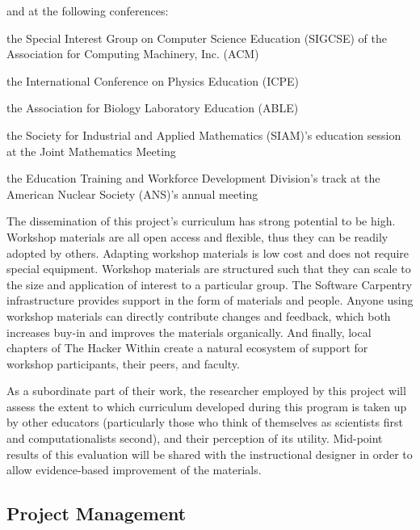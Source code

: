 \documentclass{proposalnsf}
\newlength{\up}
\begin{document}
and at the following conferences:

\begin{compactitem}

\item
  the Special Interest Group on Computer Science Education (SIGCSE) of the Association for Computing Machinery, Inc. (ACM)

\item
  the International Conference on Physics Education (ICPE)

\item
  the Association for Biology Laboratory Education (ABLE)

\item
  the Society for Industrial and Applied Mathematics (SIAM)'s education session at the Joint Mathematics Meeting

\item
  the Education Training and Workforce Development Division's track at the American Nuclear Society (ANS)'s annual meeting

\end{compactitem}

The dissemination of this project's curriculum has strong potential to
be high. Workshop materials are all open access and flexible, thus
they can be readily adopted by others. Adapting workshop materials is
low cost and does not require special equipment. Workshop materials
are structured such that they can scale to the size and application of
interest to a particular group. The Software Carpentry infrastructure
provides support in the form of materials and people. Anyone using
workshop materials can directly contribute changes and feedback, which
both increases buy-in and improves the materials organically. And
finally, local chapters of The Hacker Within create a natural
ecosystem of support for workshop participants, their peers, and
faculty.

As a subordinate part of their work, the researcher employed by this
project will assess the extent to which curriculum developed during
this program is taken up by other educators (particularly those who
think of themselves as scientists first and computationalists second),
and their perception of its utility.  Mid-point results of this
evaluation will be shared with the instructional designer in order to
allow evidence-based improvement of the materials.

\subsection{Project Management}
\end{document}
